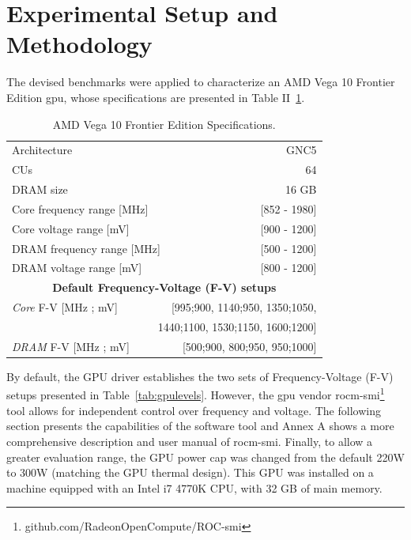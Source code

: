 \section{Experimental Setup and Methodology}

The devised benchmarks were applied to characterize an AMD Vega 10 Frontier Edition \acrshort{gpu}, whose specifications are presented in Table II~\ref{tab:Vega10specs}. 

\begin{table}[htbp]
    \caption{AMD Vega 10 Frontier Edition Specifications.}
    \begin{center}
            \begin{tabular}{lr}
                \hline
                {Architecture} & GNC5\\
                {CUs} & 64\\
                {DRAM size} & 16 GB\\
                {Core frequency range [MHz]} & [852 - 1980]\\
                {Core voltage range [mV]} & [900 - 1200]\\
                {DRAM  frequency range [MHz]} & [500 - 1200] \\ 
                {DRAM  voltage range [mV]} & [800 - 1200] \\
                \hline
                \multicolumn{2}{c}{\textbf{Default Frequency-Voltage (F-V) setups}}\\
                \hline
                {\textit{Core} F-V [MHz ; mV]} & [995;900, 1140;950, 1350;1050, \\
                \multicolumn{2}{r}{ 1440;1100, 1530;1150, 1600;1200{]}} \\
                {\textit{DRAM} F-V [MHz ; mV]} & [500;900, 800;950, 950;1000] \\
                \hline
            \end{tabular}%
    \end{center}
    \label{tab:Vega10specs}
\end{table}

By default, the GPU driver establishes the two sets of Frequency-Voltage (F-V) setups presented in Table~\ref{tab:gpulevels}. However, the \acrshort{gpu} vendor rocm-smi\footnote{github.com/RadeonOpenCompute/ROC-smi} tool allows for independent control over frequency and voltage. The following section presents the capabilities of the software tool and Annex A shows a more comprehensive description and user manual of rocm-smi. Finally, to allow a greater evaluation range, the GPU power cap was changed from the default 220W to 300W (matching the GPU thermal design). This GPU was installed on a machine equipped with an Intel i7 4770K CPU, with 32 GB of main memory. 




